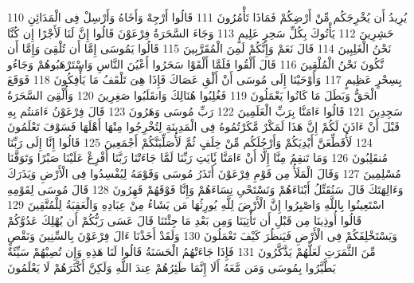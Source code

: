 \documentclass[20pt,a4paper]{article}
\begin{document}
{\tiny\colorbox{cl_aya}{110}} يُرِيدُ أَن يُخْرِجَكُم مِّنْ أَرْضِكُمْ فَمَاذَا تَأْمُرُونَ
{\tiny\colorbox{cl_aya}{111}} قَالُوا أَرْجِهْ وَأَخَاهُ وَأَرْسِلْ فِى الْمَدَائِنِ حَشِرِينَ
{\tiny\colorbox{cl_aya}{112}} يَأْتُوكَ بِكُلِّ سَحِرٍ عَلِيمٍ
{\tiny\colorbox{cl_aya}{113}} وَجَاءَ السَّحَرَةُ فِرْعَوْنَ قَالُوا إِنَّ لَنَا لَأَجْرًا إِن كُنَّا نَحْنُ الْغَلِبِينَ
{\tiny\colorbox{cl_aya}{114}} قَالَ نَعَمْ وَإِنَّكُمْ لَمِنَ الْمُقَرَّبِينَ
{\tiny\colorbox{cl_aya}{115}} قَالُوا يَمُوسَى إِمَّا أَن تُلْقِىَ وَإِمَّا أَن نَّكُونَ نَحْنُ الْمُلْقِينَ
{\tiny\colorbox{cl_aya}{116}} قَالَ أَلْقُوا فَلَمَّا أَلْقَوْا سَحَرُوا أَعْيُنَ النَّاسِ وَاسْتَرْهَبُوهُمْ وَجَاءُو بِسِحْرٍ عَظِيمٍ
{\tiny\colorbox{cl_aya}{117}} وَأَوْحَيْنَا إِلَى مُوسَى أَنْ أَلْقِ عَصَاكَ فَإِذَا هِىَ تَلْقَفُ مَا يَأْفِكُونَ
{\tiny\colorbox{cl_aya}{118}} فَوَقَعَ الْحَقُّ وَبَطَلَ مَا كَانُوا يَعْمَلُونَ
{\tiny\colorbox{cl_aya}{119}} فَغُلِبُوا هُنَالِكَ وَانقَلَبُوا صَغِرِينَ
{\tiny\colorbox{cl_aya}{120}} وَأُلْقِىَ السَّحَرَةُ سَجِدِينَ
{\tiny\colorbox{cl_aya}{121}} قَالُوا ءَامَنَّا بِرَبِّ الْعَلَمِينَ
{\tiny\colorbox{cl_aya}{122}} رَبِّ مُوسَى وَهَرُونَ
{\tiny\colorbox{cl_aya}{123}} قَالَ فِرْعَوْنُ ءَامَنتُم بِهِ قَبْلَ أَنْ ءَاذَنَ لَكُمْ إِنَّ هَذَا لَمَكْرٌ مَّكَرْتُمُوهُ فِى الْمَدِينَةِ لِتُخْرِجُوا مِنْهَا أَهْلَهَا فَسَوْفَ تَعْلَمُونَ
{\tiny\colorbox{cl_aya}{124}} لَأُقَطِّعَنَّ أَيْدِيَكُمْ وَأَرْجُلَكُم مِّنْ خِلَفٍ ثُمَّ لَأُصَلِّبَنَّكُمْ أَجْمَعِينَ
{\tiny\colorbox{cl_aya}{125}} قَالُوا إِنَّا إِلَى رَبِّنَا مُنقَلِبُونَ
{\tiny\colorbox{cl_aya}{126}} وَمَا تَنقِمُ مِنَّا إِلَّا أَنْ ءَامَنَّا بَِٔايَتِ رَبِّنَا لَمَّا جَاءَتْنَا رَبَّنَا أَفْرِغْ عَلَيْنَا صَبْرًا وَتَوَفَّنَا مُسْلِمِينَ
{\tiny\colorbox{cl_aya}{127}} وَقَالَ الْمَلَأُ مِن قَوْمِ فِرْعَوْنَ أَتَذَرُ مُوسَى وَقَوْمَهُ لِيُفْسِدُوا فِى الْأَرْضِ وَيَذَرَكَ وَءَالِهَتَكَ قَالَ سَنُقَتِّلُ أَبْنَاءَهُمْ وَنَسْتَحْىِ نِسَاءَهُمْ وَإِنَّا فَوْقَهُمْ قَهِرُونَ
{\tiny\colorbox{cl_aya}{128}} قَالَ مُوسَى لِقَوْمِهِ اسْتَعِينُوا بِاللَّهِ وَاصْبِرُوا إِنَّ الْأَرْضَ لِلَّهِ يُورِثُهَا مَن يَشَاءُ مِنْ عِبَادِهِ وَالْعَقِبَةُ لِلْمُتَّقِينَ
{\tiny\colorbox{cl_aya}{129}} قَالُوا أُوذِينَا مِن قَبْلِ أَن تَأْتِيَنَا وَمِن بَعْدِ مَا جِئْتَنَا قَالَ عَسَى رَبُّكُمْ أَن يُهْلِكَ عَدُوَّكُمْ وَيَسْتَخْلِفَكُمْ فِى الْأَرْضِ فَيَنظُرَ كَيْفَ تَعْمَلُونَ
{\tiny\colorbox{cl_aya}{130}} وَلَقَدْ أَخَذْنَا ءَالَ فِرْعَوْنَ بِالسِّنِينَ وَنَقْصٍ مِّنَ الثَّمَرَتِ لَعَلَّهُمْ يَذَّكَّرُونَ
{\tiny\colorbox{cl_aya}{131}} فَإِذَا جَاءَتْهُمُ الْحَسَنَةُ قَالُوا لَنَا هَذِهِ وَإِن تُصِبْهُمْ سَيِّئَةٌ يَطَّيَّرُوا بِمُوسَى وَمَن مَّعَهُ أَلَا إِنَّمَا طَئِرُهُمْ عِندَ اللَّهِ وَلَكِنَّ أَكْثَرَهُمْ لَا يَعْلَمُونَ
\end{document}
